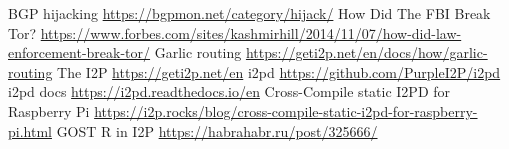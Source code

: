 \documentclass[10pt, a5paper]{article}
\begin{document}
\begin{thebibliography}{20}
 BGP hijacking \url{https://bgpmon.net/category/hijack/}
 How Did The FBI Break Tor? \url{https://www.forbes.com/sites/kashmirhill/2014/11/07/how-did-law-enforcement-break-tor/}
 Garlic routing \url{https://geti2p.net/en/docs/how/garlic-routing}
 The I2P \url{https://geti2p.net/en}
 i2pd \url{https://github.com/PurpleI2P/i2pd}
 i2pd docs \url{https://i2pd.readthedocs.io/en}
 Cross-Compile static I2PD for Raspberry Pi \url{https://i2p.rocks/blog/cross-compile-static-i2pd-for-raspberry-pi.html}
 GOST R in I2P \url{https://habrahabr.ru/post/325666/}
\end{thebibliography}
\end{document}
